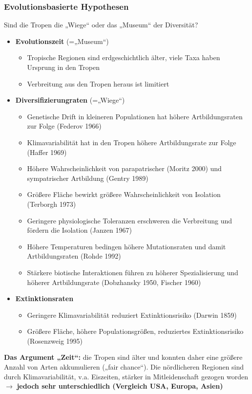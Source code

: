 \newpage
\subsubsection{Evolutionsbasierte Hypothesen}
Sind die Tropen die „Wiege“ oder das „Museum“ der Diversität?

\begin{itemize}
	\item \textbf{Evolutionszeit} (=„Museum“)
	\begin{itemize}
		\item Tropische Regionen sind erdgeschichtlich älter, viele Taxa haben Ursprung in den Tropen
		\item Verbreitung aus den Tropen heraus ist limitiert
	\end{itemize}
	\item \textbf{Diversifizierungraten} (=„Wiege“)
	\begin{itemize}
		\item Genetische Drift in kleineren Populationen hat höhere Artbildungsraten zur Folge (Federov 1966)
		\item Klimavariabilität hat in den Tropen höhere Artbildungsrate zur Folge (Haffer 1969)
		\item Höhere Wahrscheinlichkeit von parapatrischer (Moritz 2000) und sympatrischer Artbildung (Gentry 1989)
		\item Größere Fläche bewirkt größere Wahrscheinlichkeit von Isolation (Terborgh 1973)
		\item Geringere physiologische Toleranzen erschweren die Verbreitung und fördern die Isolation (Janzen 1967)
		\item Höhere Temperaturen bedingen höhere Mutationsraten und damit Artbildungsraten (Rohde 1992)
		\item Stärkere biotische Interaktionen führen zu höherer Spezialisierung und höherer Artbildungsrate (Dobzhansky 1950, Fischer 1960)
	\end{itemize}
	\item \textbf{Extinktionsraten}
	\begin{itemize}
		\item Geringere Klimavariabilität reduziert Extinktionsrisiko (Darwin 1859)
		\item Größere Fläche, höhere Populationsgrößen, reduziertes Extinktionsrisiko (Rosenzweig 1995)
	\end{itemize}
\end{itemize}

\textbf{Das Argument „Zeit“:} die Tropen sind älter und konnten daher eine größere Anzahl von Arten akkumulieren („fair chance“). Die nördlicheren Regionen sind durch Klimavariabilität, v.a. Eiszeiten, stärker in Mitleidenschaft gezogen worden $\rightarrow$ \textbf{jedoch sehr unterschiedlich (Vergleich USA, Europa, Asien)}